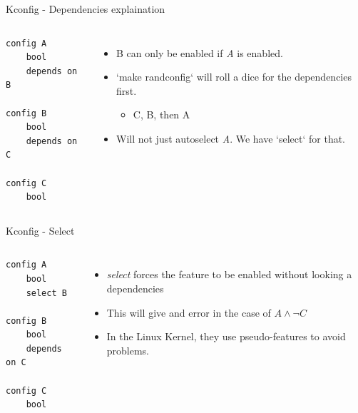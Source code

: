 \documentclass[mathserif,serif]{beamer}
\newenvironment{items}{
\begin{itemize}
  \setlength{\itemsep}{0pt}
  \setlength{\parskip}{7pt}
  \setlength{\parsep}{4pt}
}{\end{itemize}}
\begin{document}
\begin{frame}[t,fragile]{Kconfig - Dependencies explaination}

    \begin{columns}[T]
    \begin{lstlisting}
config A
    bool
    depends on B

config B
    bool
    depends on C

config C
    bool
    \end{lstlisting}
    \begin{items}
        \item B can only be enabled if \emph{A} is enabled.
        \item `make randconfig` will roll a dice for the dependencies first.
        \begin{items}
            \item C, B, then A
        \end{items}
        \item Will not just autoselect \emph{A}. We have `select` for that.
    \end{items}

    \end{columns}
    
\end{frame}

\begin{frame}[t,fragile]{Kconfig - Select}

    \begin{columns}[T]
    \begin{lstlisting}
config A
    bool
    select B

config B
    bool
    depends on C

config C
    bool
    \end{lstlisting}


    \begin{items}
        \item \emph{select} forces the feature to be enabled without looking a 
                dependencies
        \item This will give and error in the case of $A \wedge  \neg C$
        \item In the Linux Kernel, they use pseudo-features to avoid problems.
    \end{items}

    \end{columns}
\end{frame}
\end{document}
